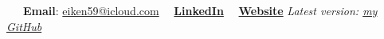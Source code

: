 \documentclass[letterpaper, 11pt]{article}
\begin{document}


\vspace{0.5cm}
\noindent\:\ \ \ 
\textbf{Email}: \href{mailto:eiken59@icloud.com}{eiken59@icloud.com} 
\qquad \ \ 
\href{https://www.linkedin.com/in/eiken59}{\textbf{LinkedIn}} 
\qquad \ \ 
\href{https://eiken59.github.io}{\textbf{Website}}
\hfill 
\textit{\footnotesize Latest version: \href{https://github.com/eiken59/CV/blob/main/eiken59_CV.pdf}{my GitHub}\ \ \ \ }
\vspace{0.2cm}

\end{document}
